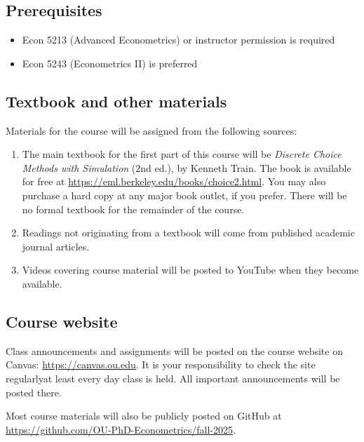 \documentclass[11pt,english]{article}
\begin{document}
\subsection*{Prerequisites}

\begin{itemize}
\item Econ 5213 (Advanced Econometrics) or instructor permission is required
\item Econ 5243 (Econometrics II) is preferred
\end{itemize}

\subsection*{Textbook and other materials}

Materials for the course will be assigned from the following sources:
\begin{enumerate}
    \item The main textbook for the first part of this course will be \emph{Discrete Choice Methods with Simulation} (2nd ed.), by Kenneth Train. The book is available for free at \url{https://eml.berkeley.edu/books/choice2.html}. You may also purchase a hard copy at any major book outlet, if you prefer. There will be no formal textbook for the remainder of the course.
    \item Readings not originating from a textbook will come from published academic journal articles.
    \item Videos covering course material will be posted to YouTube when they become available.
\end{enumerate}

\subsection*{Course website}

Class announcements and assignments will be posted on the course website on Canvas: \url{https://canvas.ou.edu}. It is your responsibility to check the site regularly\textemdash at least every day class is held. All important announcements will be posted there.

Most course materials will also be publicly posted on GitHub at \url{https://github.com/OU-PhD-Econometrics/fall-2025}.
\end{document}
